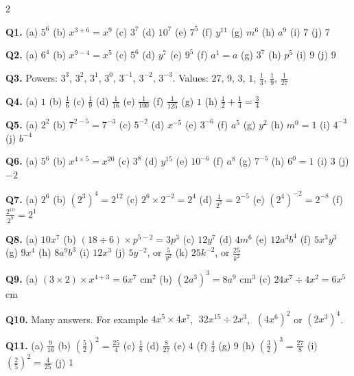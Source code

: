 \documentclass[12pt,a4paper]{article}
\newcommand{\ealkey}[1]{\textcolor{ealkeycolour}{#1}}
\begin{document}
{\small
\begin{multicols}{2}
\raggedcolumns
\setlength{\parskip}{4pt}

\textbf{Q1.} (a) $5^6$ \quad (b) $x^{3+6}=x^9$ \quad (c) $3^7$ \quad
(d) $10^7$ \quad (e) $7^5$ \quad (f) $y^{11}$ \quad (g) $m^6$ \quad
(h) $a^9$ \quad (i) $7$ \quad (j) $7$

\textbf{Q2.} (a) $6^4$ \quad (b) $x^{9-4}=x^5$ \quad (c) $5^6$ \quad
(d) $y^7$ \quad (e) $9^5$ \quad (f) $a^1=a$ \quad (g) $3^7$ \quad (h) $p^5$
\quad (i) $9$ \quad (j) $9$

\textbf{Q3.} \ealkey{Powers}: $3^3$, $3^2$, $3^1$, $3^0$, $3^{-1}$, $3^{-2}$, $3^{-3}$.
Values: $27$, $9$, $3$, $1$, $\frac13$, $\frac19$, $\frac1{27}$

\textbf{Q4.} (a) $1$ \quad (b) $\frac16$ \quad (c) $\frac19$ \quad
(d) $\frac1{16}$ \quad (e) $\frac1{100}$ \quad (f) $\frac1{125}$ \quad
(g) $1$ \quad (h) $\frac12+\frac14=\frac34$

\textbf{Q5.} (a) $2^2$ \quad (b) $7^{2-5}=7^{-3}$ \quad (c) $5^{-2}$ \quad
(d) $x^{-5}$ \quad (e) $3^{-6}$ \quad (f) $a^5$ \quad (g) $y^2$ \quad
(h) $m^0=1$ \quad (i) $4^{-3}$ \quad (j) $b^{-4}$

\textbf{Q6.} (a) $5^6$ \quad (b) $x^{4\times5}=x^{20}$ \quad (c) $3^8$ \quad
(d) $y^{15}$ \quad (e) $10^{-6}$ \quad (f) $a^8$ \quad (g) $7^{-5}$ \quad
(h) $6^0=1$ \quad (i) $3$ \quad (j) $-2$

\textbf{Q7.} (a) $2^6$ \quad (b) $(2^3)^4=2^{12}$ \quad
(c) $2^6\times2^{-2}=2^4$ \quad (d) $\frac1{2^5}=2^{-5}$ \quad
(e) $(2^4)^{-2}=2^{-8}$ \quad (f) $\frac{2^{10}}{2^9}=2^1$

\textbf{Q8.} (a) $10x^7$ \quad (b) $(18\div6)\times p^{5-2}=3p^3$ \quad
(c) $12y^7$ \quad (d) $4m^6$ \quad (e) $12a^3b^4$ \quad (f) $5x^3y^3$ \quad
(g) $9x^4$ \quad (h) $8a^9b^3$ \quad (i) $12x^3$ \quad
(j) $5y^{-2}$, or $\frac{5}{y^2}$ \quad (k) $25k^{-2}$, or $\frac{25}{k^2}$

\textbf{Q9.} (a) $(3\times2)\times x^{4+3}=6x^7$ cm$^2$ \quad
(b) $(2a^3)^3=8a^9$ cm$^3$ \quad (c) $24x^7\div4x^2=6x^5$ cm

\textbf{Q10.} Many answers. For example $4x^5\times4x^7$,
$\;32x^{15}\div2x^3$, $\;(4x^6)^2$ or $(2x^3)^4$.

\textbf{Q11.} (a) $\frac{9}{16}$ \quad (b) $\left(\frac52\right)^2=\frac{25}{4}$
\quad (c) $\frac18$ \quad (d) $\frac{8}{27}$ \quad (e) $4$ \quad
(f) $\frac43$ \quad (g) $9$ \quad (h) $\left(\frac32\right)^3=\frac{27}{8}$
\quad (i) $\left(\frac25\right)^2=\frac{4}{25}$ \quad (j) $1$


\end{multicols}}
\end{document}
